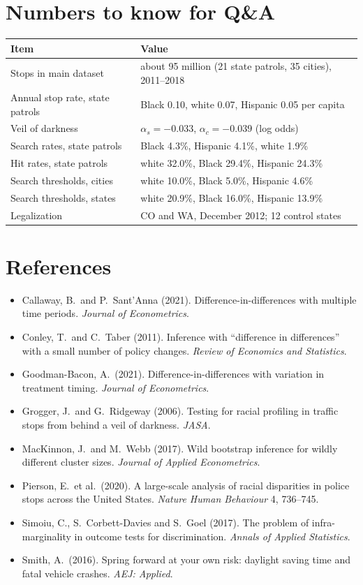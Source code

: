 \documentclass[11pt]{article}
\newcommand{\1}{\mathbf{1}}
\begin{document}
\section{Numbers to know for Q\&A}
\begin{center}
\begin{tabular}{@{}ll@{}}
\toprule
Item & Value \\
\midrule
Stops in main dataset & about 95 million (21 state patrols, 35 cities), 2011--2018 \\
Annual stop rate, state patrols & Black 0.10, white 0.07, Hispanic 0.05 per capita \\
Veil of darkness & $\alpha_s = -0.033$, $\alpha_c = -0.039$ (log odds) \\
Search rates, state patrols & Black 4.3\%, Hispanic 4.1\%, white 1.9\% \\
Hit rates, state patrols & white 32.0\%, Black 29.4\%, Hispanic 24.3\% \\
Search thresholds, cities & white 10.0\%, Black 5.0\%, Hispanic 4.6\% \\
Search thresholds, states & white 20.9\%, Black 16.0\%, Hispanic 13.9\% \\
Legalization & CO and WA, December 2012; 12 control states \\
\bottomrule
\end{tabular}
\end{center}

\section*{References}
\begin{itemize}[leftmargin=*]
\item Callaway, B.\ and P.\ Sant'Anna (2021). Difference-in-differences with multiple time periods. \emph{Journal of Econometrics}.
\item Conley, T.\ and C.\ Taber (2011). Inference with ``difference in differences'' with a small number of policy changes. \emph{Review of Economics and Statistics}.
\item Goodman-Bacon, A.\ (2021). Difference-in-differences with variation in treatment timing. \emph{Journal of Econometrics}.
\item Grogger, J.\ and G.\ Ridgeway (2006). Testing for racial profiling in traffic stops from behind a veil of darkness. \emph{JASA}.
\item MacKinnon, J.\ and M.\ Webb (2017). Wild bootstrap inference for wildly different cluster sizes. \emph{Journal of Applied Econometrics}.
\item Pierson, E.\ et al.\ (2020). A large-scale analysis of racial disparities in police stops across the United States. \emph{Nature Human Behaviour} 4, 736--745.
\item Simoiu, C., S.\ Corbett-Davies and S.\ Goel (2017). The problem of infra-marginality in outcome tests for discrimination. \emph{Annals of Applied Statistics}.
\item Smith, A.\ (2016). Spring forward at your own risk: daylight saving time and fatal vehicle crashes. \emph{AEJ: Applied}.
\end{itemize}
\end{document}
